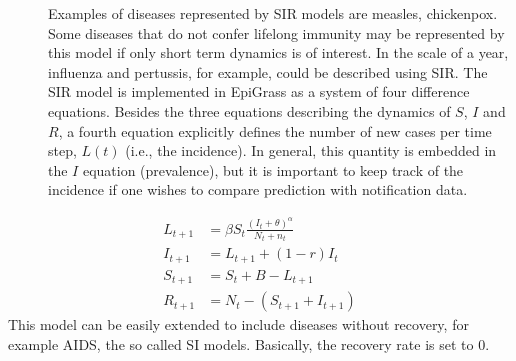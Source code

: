 \documentclass[letterpaper,10pt,english]{sphinxmanual}
\begin{document}
\ignorespaces \begin{description}
\item[{}] \leavevmode
Examples of diseases represented by SIR models are measles, chickenpox. Some diseases that do not confer lifelong immunity may be represented by this model if only short term dynamics is of interest. In the scale of a year, influenza and pertussis, for example, could be described using SIR. The SIR model is implemented in EpiGrass as a system of four difference equations. Besides the three equations describing the dynamics of \(S\), \(I\) and \(R\), a fourth equation explicitly defines the number of new cases per time step, \(L(t)\) (i.e., the incidence). In general, this quantity is embedded in the \(I\) equation (prevalence), but it is important to keep track of the incidence if one wishes to compare prediction with notification data.

\end{description}
\label{equation:intromodels:E:SIRmodel}\begin{align}
    L_{t+1} &= \beta S_t \frac{(I_t+\theta)^\alpha} {N_t+n_t}\nonumber \\
    I_{t+1} &= L_{t+1} + (1-r)I_t\nonumber\\
    S_{t+1} &= S_t + B - L_{t+1}\nonumber\\
    R_{t+1} &= N_t-(S_{t+1}+I_{t+1})\nonumber
\end{align}
This model can be easily extended to include diseases without recovery, for example AIDS, the so called SI models. Basically, the recovery rate is set to 0.
\end{document}
